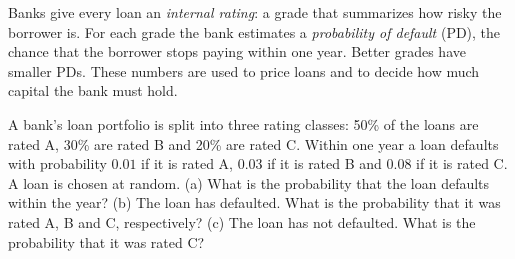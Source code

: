
\begin{problem}
	\begin{context}
		Banks give every loan an \emph{internal rating}: a grade that summarizes
		how risky the borrower is. For each grade the bank estimates a
		\emph{probability of default} (PD), the chance that the borrower stops
		paying within one year. Better grades have smaller PDs. These numbers
		are used to price loans and to decide how much capital the bank must
		hold.
	\end{context}
	A bank's loan portfolio is split into three rating classes: 50\% of the
	loans are rated A, 30\% are rated B and 20\% are rated C. Within one year a
	loan defaults with probability $0.01$ if it is rated A, $0.03$ if it is
	rated B and $0.08$ if it is rated C. A loan is chosen at random.
	(a) What is the probability that the loan defaults within the year?
	(b) The loan has defaulted. What is the probability that it was rated A,
	B and C, respectively?
	(c) The loan has not defaulted. What is the probability that it was rated
	C?
\end{problem}

